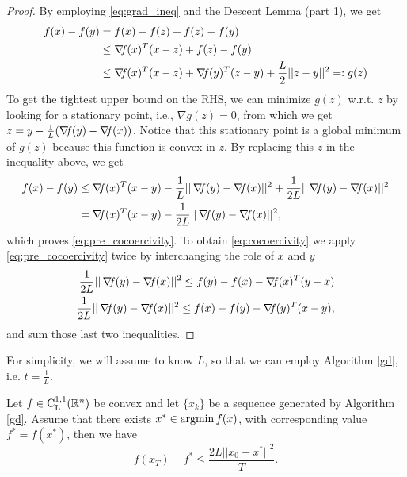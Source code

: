\documentclass[10pt,a4paper]{article}
\begin{document}
\begin{proof}
	By employing \eqref{eq:grad_ineq} and the Descent Lemma (part 1), we get
	\begin{equation*}
		\begin{split}
			f(x) - f(y) &= f(x) - f(z) + f(z) - f(y)\\
			& \leq \operatorname*{\mathit{\nabla \!f}}(x)^T(x-z) + f(z) - f(y)\\
			&\leq \operatorname*{\mathit{\nabla \!f}}(x)^T(x-z) + \operatorname*{\mathit{\nabla \!f}}(y)^T(z-y) + \frac{L}{2}||z-y||^2=:g(z)
		\end{split}
	\end{equation*}
To get the tightest upper bound on the RHS, we can minimize $g(z)$ w.r.t. $z$ by looking for a stationary point, i.e., $\nabla g(z)=0$, from which we get $z=y - \frac{1}{L}(\operatorname*{\mathit{\nabla \!f}}(y)-\operatorname*{\mathit{\nabla \!f}}(x))$. Notice that this stationary point is a global minimum of $g(z)$ because this function is convex in $z$. By replacing this $z$ in the inequality above, we get 
\begin{equation*}
	\begin{split}
		f(x) - f(y) &\leq \grad(x)^T(x-y) -\frac{1}{L}||\grad(y)-\grad(x)||^2 + \frac{1}{2L}||\grad(y)-\grad(x)||^2\\
		&= \grad(x)^T(x-y)-\frac{1}{2L}||\grad(y)-\grad(x)||^2,
	\end{split}
\end{equation*}
which proves \eqref{eq:pre_cocoercivity}. To obtain \eqref{eq:cocoercivity} we apply \eqref{eq:pre_cocoercivity} twice by interchanging the role of $x$ and $y$
\begin{align*}
	\frac{1}{2L} ||\operatorname*{\mathit{\nabla \!f}}(y)-\operatorname*{\mathit{\nabla \!f}}(x)||^2 \leq f(y)-f(x) -\operatorname*{\mathit{\nabla \!f}}(x)^T(y-x)\\
	\frac{1}{2L} ||\operatorname*{\mathit{\nabla \!f}}(y)-\operatorname*{\mathit{\nabla \!f}}(x)||^2 \leq f(x)-f(y) -\operatorname*{\mathit{\nabla \!f}}(y)^T(x-y),
\end{align*}
and sum those last two inequalities.
\end{proof}
\noindent For simplicity, we will assume to know $L$, so that we can employ Algorithm \eqref{gd}, i.e. $t=\frac{1}{L}$.
\begin{theorem}
	Let $f\in \mathord{\mathrm{C^{1,1}_{L}}}(\mathbb{R}^n)$ be convex and let $\{x_k\}$ be a sequence generated by Algorithm \ref{gd}. Assume that there exists $x^*\in \operatorname*{argmin} f(x)$, with corresponding value $f^*=f(x^*)$, then we have 
	\begin{equation}\label{eq:convex_convergence}
		f(x_T)-f^* \leq \frac{2L ||x_0-x^*||^2}{T}.
	\end{equation}
\end{theorem}
\end{document}
